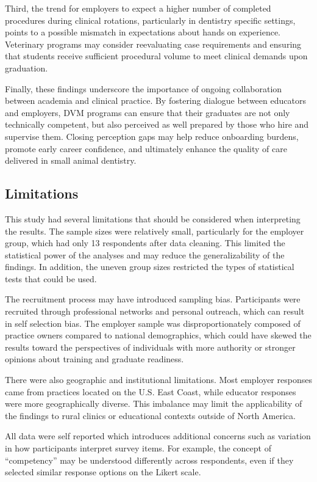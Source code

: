 \documentclass[
  12pt,
  letterpaper,
  DIV=11,
  numbers=noendperiod]{scrartcl}
\numberwithin{figure}{section}
\numberwithin{table}{section}
\begin{document}
Third, the trend for employers to expect a higher number of completed
procedures during clinical rotations, particularly in dentistry specific
settings, points to a possible mismatch in expectations about hands on
experience. Veterinary programs may consider reevaluating case
requirements and ensuring that students receive sufficient procedural
volume to meet clinical demands upon graduation.

Finally, these findings underscore the importance of ongoing
collaboration between academia and clinical practice. By fostering
dialogue between educators and employers, DVM programs can ensure that
their graduates are not only technically competent, but also perceived
as well prepared by those who hire and supervise them. Closing
perception gaps may help reduce onboarding burdens, promote early career
confidence, and ultimately enhance the quality of care delivered in
small animal dentistry.

\subsection{Limitations}\label{limitations}

This study had several limitations that should be considered when
interpreting the results. The sample sizes were relatively small,
particularly for the employer group, which had only 13 respondents after
data cleaning. This limited the statistical power of the analyses and
may reduce the generalizability of the findings. In addition, the uneven
group sizes restricted the types of statistical tests that could be
used.

The recruitment process may have introduced sampling bias. Participants
were recruited through professional networks and personal outreach,
which can result in self selection bias. The employer sample was
disproportionately composed of practice owners compared to national
demographics, which could have skewed the results toward the
perspectives of individuals with more authority or stronger opinions
about training and graduate readiness.

There were also geographic and institutional limitations. Most employer
responses came from practices located on the U.S. East Coast, while
educator responses were more geographically diverse. This imbalance may
limit the applicability of the findings to rural clinics or educational
contexts outside of North America.

All data were self reported which introduces additional concerns such as
variation in how participants interpret survey items. For example, the
concept of ``competency'' may be understood differently across
respondents, even if they selected similar response options on the
Likert scale.
\end{document}
